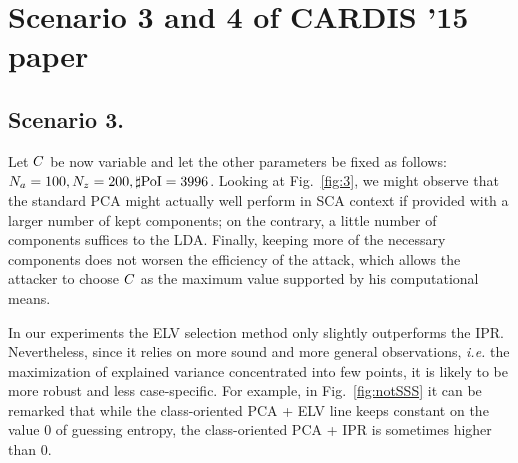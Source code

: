 \chapter{Scenario 3 and 4 of CARDIS '15 paper}\label{Appendix_scenario3_4_cardis2015}

\section{Scenario 3.}
Let  $C$ be now variable and let the other parameters be fixed as follows: $N_a = 100, N_z=200, \sharp\mathrm{PoI} = 3996$. Looking at Fig.~\ref{fig:3}, we might observe that the standard PCA might actually well perform in SCA context if provided with a larger number of kept components; on the contrary, a little number of components suffices to the LDA. Finally, keeping more of the necessary components does not worsen the efficiency of the attack, which allows the attacker to choose $C$ as the maximum value supported by his computational means.

\begin{remark}
In our experiments the ELV selection method only slightly outperforms the IPR. Nevertheless, since it relies on more sound and more general observations, {\em i.e.} the maximization of explained variance concentrated into few points, it is likely to be more robust and less case-specific. For example, in Fig.~\ref{fig:notSSS} it can be remarked that while the class-oriented PCA + ELV line keeps constant on the value 0 of guessing entropy, the class-oriented PCA + IPR is sometimes higher than 0.
\end{remark}

